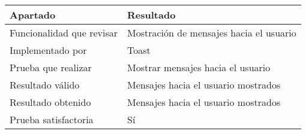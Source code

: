 \bigskip

\begin{center}
    \begin{tabulary}{0.8\textwidth}{L|L}
        \textbf{Apartado} & \textbf{Resultado} \\ \hline
        Funcionalidad que revisar & Mostración de mensajes hacia el usuario \\
        Implementado por & Toast \\
        Prueba que realizar & Mostrar mensajes hacia el usuario \\
        Resultado válido & Mensajes hacia el usuario mostrados \\
        Resultado obtenido & Mensajes hacia el usuario mostrados \\
        Prueba satisfactoria & Sí \\
    \end{tabulary}
\end{center}

\newpage